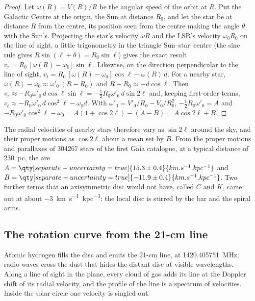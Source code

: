 \begin{proof}
Let $\omega(R) = V(R)/R$ be the angular speed of the orbit at $R$. Put
the Galactic Centre at the origin, the Sun at distance $R_0$, and let the
star be at distance $R$ from the centre, its position seen from the
centre making the angle $\theta$ with the Sun's. Projecting the star's
velocity $\omega R$ and the LSR's velocity $\omega_0 R_0$ on the line of
sight, a little trigonometry in the triangle Sun--star--centre (the sine
rule gives $R\sin(\ell + \theta) = R_0\sin\ell$) gives the exact result
$v_r = R_0\,[\omega(R) - \omega_0]\sin\ell$. Likewise, on the direction
perpendicular to the line of sight,
$v_t = R_0\,[\omega(R) - \omega_0]\cos\ell - \omega(R)\,d$. For a nearby
star, $\omega(R) - \omega_0 \approx \omega'_0\,(R - R_0)$ and
$R - R_0 \approx -d\cos\ell$. Then
$v_r \approx -R_0\omega'_0\,d\cos\ell\sin\ell = -\tfrac12 R_0\omega'_0\,
d\sin 2\ell$ and, keeping first-order terms,
$v_t \approx -R_0\omega'_0\,d\cos^2\ell - \omega_0 d$. With
$\omega'_0 = V'_0/R_0 - V_0/R_0^2$, $-\tfrac12 R_0\omega'_0 = A$ and
$-R_0\omega'_0\cos^2\ell - \omega_0 = A(1 + \cos 2\ell) - (A - B) =
A\cos 2\ell + B$.
\end{proof}

The radial velocities of nearby stars therefore vary as $\sin 2\ell$ around
the sky, and their proper motions as $\cos 2\ell$ about a mean set by $B$.
From the proper motions and parallaxes of \num{304267} stars of the first
Gaia catalogue, at a typical distance of \qty{230}{pc}, the 
are $A = \qty[separate-uncertainty=true]{15.3 \pm 0.4}{km.s^{-1}.kpc^{-1}}$
and $B = \qty[separate-uncertainty=true]{-11.9 \pm 0.4}{km.s^{-1}.kpc^{-1}}$.
Two further terms that an axisymmetric disc would not have, called $C$
and $K$, came out at about \qty{-3}{km.s^{-1}.kpc^{-1}}: the local disc is
stirred by the bar and the spiral arms.

\subsection*{The rotation curve from the 21-cm line}

Atomic hydrogen fills the disc and emits the 21-cm line, at
\qty{1420.405751}{MHz}; radio waves cross the dust that hides the
distant disc at visible wavelengths. Along a line of sight
in the plane, every cloud of gas adds its line at the Doppler shift of
its radial velocity, and the profile of the line is a spectrum of
velocities. Inside the solar circle one velocity is singled out.

